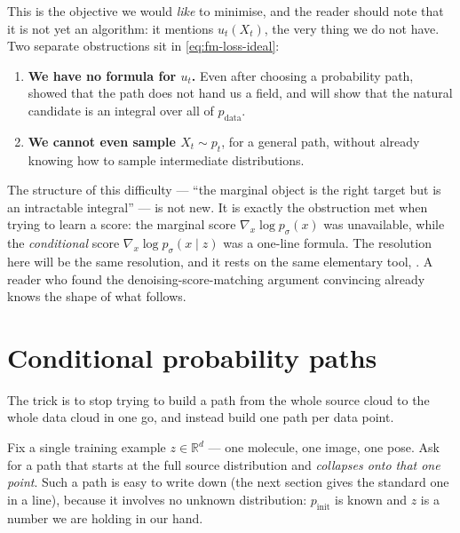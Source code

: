 \documentclass[11pt,a4paper]{report}
\theoremstyle{definition}
\theoremstyle{remark}
\newcommand{\RR}{\mathbb R}
\begin{document}
This is the objective we would \emph{like} to minimise, and the reader
should note that it is not yet an algorithm: it mentions $u_t(X_t)$, the
very thing we do not have. Two separate obstructions sit in
\eqref{eq:fm-loss-ideal}:

\begin{enumerate}
\item \textbf{We have no formula for $u_t$.} Even after choosing a
      probability path,  showed that the path
      does not hand us a field, and  will show that
      the natural candidate is an integral over all of $p_{\mathrm{data}}$.
\item \textbf{We cannot even sample $X_t\sim p_t$}, for a general path,
      without already knowing how to sample intermediate distributions.
\end{enumerate}

The structure of this difficulty --- ``the marginal object is the right
target but is an intractable integral'' --- is not new. It is exactly the
obstruction  met when trying to learn a
score: the marginal score $\nabla_x\log p_\sigma(x)$ was unavailable, while
the \emph{conditional} score $\nabla_x\log p_\sigma(x\mid z)$ was a
one-line formula. The resolution here will be the same resolution, and it
rests on the same elementary tool, . A reader
who found the denoising-score-matching argument convincing already knows
the shape of what follows.

\section{Conditional probability paths}
\label{sec:cfm-scratch}

The trick is to stop trying to build a path from the whole source cloud to
the whole data cloud in one go, and instead build one path per data point.

Fix a single training example $z\in\RR^d$ --- one molecule, one image, one
pose. Ask for a path that starts at the full source distribution and
\emph{collapses onto that one point}. Such a path is easy to write down
(the next section gives the standard one in a line), because it involves no
unknown distribution: $p_{\mathrm{init}}$ is known and $z$ is a number we
are holding in our hand.
\end{document}
